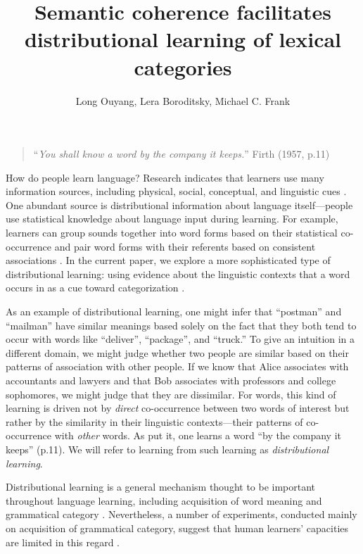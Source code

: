 \documentclass[man,floatsintext]{apa6}
\title{Semantic coherence facilitates distributional learning of lexical categories}
\author{Long Ouyang, Lera Boroditsky, Michael C. Frank}
\affiliation{Department of Psychology, Stanford University\vskip 5em Word count: 6,251}
\begin{document}
\maketitle

\begin{quote}
``\emph{You shall know a word by the company it keeps.}'' Firth (1957, p.11)
\end{quote}

How do people learn language? Research indicates that learners use many information sources, including physical, social, conceptual, and linguistic cues \citep{clark1988, markman1991, gleitman1990, baldwin1993, hollich2000}. One abundant source is distributional information about language itself---people use statistical knowledge about language input during learning. For example, learners can group sounds together into word forms based on their statistical co-occurrence \citep{saffran1996a, saffran1996b} and pair word forms with their referents based on consistent associations \citep{yu2007,smith2008}. In the current paper, we explore a more sophisticated type of distributional learning: using evidence about the linguistic contexts that a word occurs in as a cue toward categorization \citep{smith1966, maratsos1980, braine1987, redington1998}.

As an example of distributional learning, one might infer that ``postman'' and ``mailman'' have similar meanings based solely on the fact that they both tend to occur with words like ``deliver'', ``package'', and ``truck.'' To give an intuition in a different domain, we might judge whether two people are similar based on their patterns of association with other people. If we know that Alice associates with accountants and lawyers and that Bob associates with professors and college sophomores, we might judge that they are dissimilar. For words, this kind of learning is driven not by \emph{direct} co-occurrence between two words of interest but rather by the similarity in their linguistic contexts---their patterns of co-occurrence with \emph{other} words. As \citet{firth1957} put it, one learns a word ``by the company it keeps'' (p.11). We will refer to learning from such learning as \emph{distributional learning}.

Distributional learning is a general mechanism thought to be important throughout language learning, including acquisition of word meaning \citep{landauer1997} and grammatical category \citep{redington1998}. Nevertheless, a number of experiments, conducted mainly on acquisition of grammatical category, suggest that human learners' capacities are limited in this regard \citep{braine1987, brooks1993, frigo1998, kempe2001, gerken2005, frank2011}.
\end{document}
